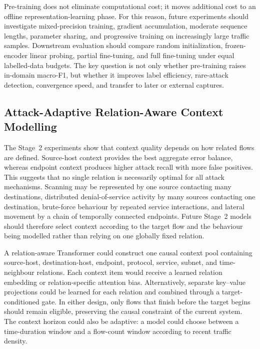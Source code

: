 \documentclass[11pt,fleqn]{report}
\begin{document}
Pre-training does not eliminate computational cost; it moves additional cost to
an offline representation-learning phase. For this reason, future experiments
should investigate mixed-precision training, gradient accumulation, moderate
sequence lengths, parameter sharing, and progressive training on increasingly
large traffic samples. Downstream evaluation should compare random
initialization, frozen-encoder linear probing, partial fine-tuning, and full
fine-tuning under equal labelled-data budgets. The key question is not only
whether pre-training raises in-domain macro-F1, but whether it improves label
efficiency, rare-attack detection, convergence speed, and transfer to later or
external captures.

\subsection{Attack-Adaptive Relation-Aware Context Modelling}
\label{subsubsec:future_relation_aware_context}

The Stage~2 experiments show that context quality depends on how related flows
are defined. Source-host context provides the best aggregate error balance,
whereas endpoint context produces higher attack recall with more false
positives. This suggests that no single relation is necessarily optimal for all
attack mechanisms. Scanning may be represented by one source contacting many
destinations, distributed denial-of-service activity by many sources contacting
one destination, brute-force behaviour by repeated service interactions, and
lateral movement by a chain of temporally connected endpoints. Future Stage~2
models should therefore select context according to the target flow and the
behaviour being modelled rather than relying on one globally fixed relation.

A relation-aware Transformer could construct one causal context pool containing
source-host, destination-host, endpoint, protocol, service, subnet, and
time-neighbour relations. Each context item would receive a learned relation
embedding or relation-specific attention bias. Alternatively, separate
key--value projections could be learned for each relation and combined through
a target-conditioned gate. In either design, only flows that finish before the
target begins should remain eligible, preserving the causal constraint of the
current system. The context horizon could also be adaptive: a model could choose
between a time-duration window and a flow-count window according to recent
traffic density.
\end{document}
